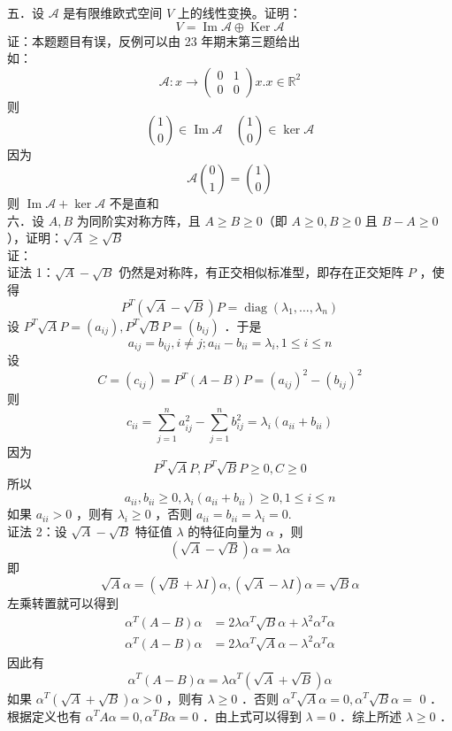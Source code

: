 \documentclass[UTF8]{ctexart}
\begin{document}
\noindent 五．设 $\mathcal{A}$ 是有限维欧式空间 $V$ 上的线性变换。证明：
$$
V=\operatorname{Im} \mathcal{A} \oplus \operatorname{Ker} \mathcal{A}
$$
证：本题题目有误，反例可以由 23 年期末第三题给出\\
如：
$$\mathcal{A}: x \rightarrow\left(\begin{array}{ll}0 & 1 \\ 0 & 0\end{array}\right) x . x \in \mathbb{R}^{2}$$
则$$\binom{1}{0} \in \operatorname{Im} \mathcal{A}\quad \binom{1}{0} \in \operatorname{ker} \mathcal{A}$$ 
因为 $$\mathcal{A}\binom{0}{1}=\binom{1}{0}$$
则 $\operatorname{Im} \mathcal{A}+\operatorname{ker} \mathcal{A}$ 不是直和\\



\noindent 六．设 $A, B$ 为同阶实对称方阵，且 $A \geq B \geq 0$（即 $A \geq 0, B \geq 0$ 且 $B-A \geq 0$ ），证明：$\sqrt{A} \geq \sqrt{B}$\\
证：\\
证法 1：$\sqrt{A}-\sqrt{B}$ 仍然是对称阵，有正交相似标准型，即存在正交矩阵 $P$ ，使得
$$
P^{T}(\sqrt{A}-\sqrt{B}) P=\operatorname{diag}\left(\lambda_{1}, \ldots, \lambda_{n}\right)
$$
设 $P^{T} \sqrt{A} P=\left(a_{i j}\right), P^{T} \sqrt{B} P=\left(b_{i j}\right)$ ．于是
$$
a_{i j}=b_{i j}, i \neq j ; a_{i i}-b_{i i}=\lambda_{i}, 1 \leq i \leq n
$$
设
$$
C=\left(c_{i j}\right)=P^{T}(A-B) P=\left(a_{i j}\right)^{2}-\left(b_{i j}\right)^{2}
$$
则
 $$c_{i i}=\sum_{j=1}^{n} a_{i j}^{2}-\sum_{j=1}^{n} b_{i j}^{2}=\lambda_{i}\left(a_{i i}+b_{i i}\right)$$
因为 
$$P^{T} \sqrt{A} P, P^{T} \sqrt{B} P \geq 0, C \geq 0$$
所以 
$$a_{i i}, b_{i i} \geq 0, \lambda_{i}\left(a_{i i}+b_{i i}\right) \geq 0,1 \leq i \leq n$$
如果 $a_{i i}>0$ ，则有 $\lambda_{i} \geq 0$ ，否则 $a_{i i}=b_{i i}=\lambda_{i}=0$.\\
证法 2：设 $\sqrt{A}-\sqrt{B}$ 特征值 $\lambda$ 的特征向量为 $\alpha$ ，则
$$
(\sqrt{A}-\sqrt{B}) \alpha=\lambda \alpha
$$
即 
$$\sqrt{A} \alpha=(\sqrt{B}+\lambda I) \alpha,(\sqrt{A}-\lambda I) \alpha=\sqrt{B} \alpha$$
左乘转置就可以得到
$$
\begin{aligned}
	\alpha^{T}(A-B) \alpha & =2 \lambda \alpha^{T} \sqrt{B} \alpha+\lambda^{2} \alpha^{T} \alpha \\
	\alpha^{T}(A-B) \alpha & =2 \lambda \alpha^{T} \sqrt{A} \alpha-\lambda^{2} \alpha^{T} \alpha
\end{aligned}
$$
因此有
$$
\alpha^{T}(A-B) \alpha=\lambda \alpha^{T}(\sqrt{A}+\sqrt{B}) \alpha
$$
如果 $\alpha^{T}(\sqrt{A}+\sqrt{B}) \alpha>0$ ，则有 $\lambda \geq 0$ ．否则 $\alpha^{T} \sqrt{A} \alpha=0, \alpha^{T} \sqrt{B} \alpha=$ 0 ．根据定义也有 $\alpha^{T} A \alpha=0, \alpha^{T} B \alpha=0$ ．由上式可以得到 $\lambda=0$ ．综上所述 $\lambda \geq 0$ ．\\
\end{document}
